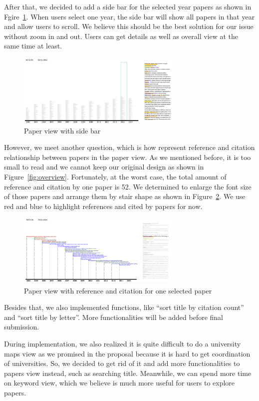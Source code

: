 After that, we decided to add a side bar for the selected year papers as shown in Fgire~\ref{fig:pv_side_bar}. When users select one year, the side bar will show all papers in that year and allow users to scroll. We believe this should be the best solution for our issue without zoom in and out. Users can get details as well as overall view at the same time at least.

\begin{figure}[h]			
	\centering
	\includegraphics[width=0.7\textwidth]{paper_view_with_side_bar}
	\caption{Paper view with side bar}
	\label{fig:pv_side_bar}
\end{figure} 

However, we meet another question, which is how represent reference and citation relationship between papers in the paper view. As we mentioned before, it is too small to read and we cannot keep our original design as shown in Figure~\ref{fig:overview}. Fortunately, at the worst case, the total amount of reference and citation by one paper is 52. We determined to enlarge the font size of those papers and arrange them by stair shape as shown in Figure~\ref{fig:pv_reference_citation}. We use red and blue to highlight references and cited by papers for now.

\begin{figure}[ht]			
	\centering
	\includegraphics[width=0.7\textwidth]{paper_view_reference_relationship}
	\caption{Paper view with reference and citation for one selected paper}
	\label{fig:pv_reference_citation}
\end{figure} 

Besides that, we also implemented functions, like ``sort title by citation count'' and ``sort title by letter''. More functionalities will be added before final submission.

During implementation, we also realized it is quite difficult to do a university maps view as we promised in the proposal because it is hard to get coordination of universities. So, we decided to get rid of it and add more functionalities to papers view instead, such as searching title. Meanwhile, we can spend more time on keyword view, which we believe is much more useful for users to explore papers. 

